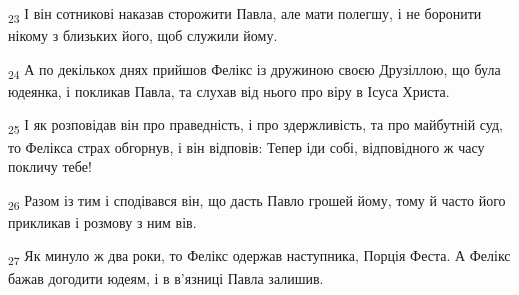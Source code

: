 \begin{tcolorbox}
\textsubscript{23} І він сотникові наказав сторожити Павла, але мати полегшу, і не боронити нікому з близьких його, щоб служили йому.
\end{tcolorbox}
\begin{tcolorbox}
\textsubscript{24} А по декількох днях прийшов Фелікс із дружиною своєю Друзіллою, що була юдеянка, і покликав Павла, та слухав від нього про віру в Ісуса Христа.
\end{tcolorbox}
\begin{tcolorbox}
\textsubscript{25} І як розповідав він про праведність, і про здержливість, та про майбутній суд, то Фелікса страх обгорнув, і він відповів: Тепер іди собі, відповідного ж часу покличу тебе!
\end{tcolorbox}
\begin{tcolorbox}
\textsubscript{26} Разом із тим і сподівався він, що дасть Павло грошей йому, тому й часто його прикликав і розмову з ним вів.
\end{tcolorbox}
\begin{tcolorbox}
\textsubscript{27} Як минуло ж два роки, то Фелікс одержав наступника, Порція Феста. А Фелікс бажав догодити юдеям, і в в'язниці Павла залишив.
\end{tcolorbox}
